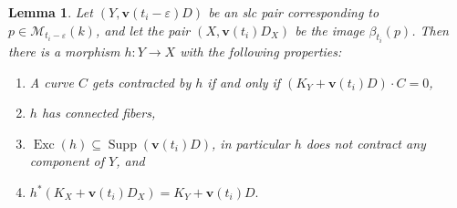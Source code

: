 \documentclass[11pt]{amsart}
\newtheorem{lemma}[theorem]{Lemma}
\theoremstyle{definition}
\theoremstyle{remark}
\newcommand{\sM}{\mathscr{M}}
\newcommand{\Supp}{\operatorname{Supp}}
\begin{document}
	\begin{lemma}\label{lemma:the:reduction:morphisms:contract:curves:in:D}
		Let $(Y,\mathbf{v}(t_i-\varepsilon)D)$ be an slc pair corresponding to  $p \in \sM_{t_i-\varepsilon}(k)$, and
		let the pair $(X,\mathbf{v}(t_i)D_X)$ be the image  $\beta_{t_i}(p)$. Then there is a morphism $h: Y \to X$ with the following properties:
		\begin{enumerate}
			\item A curve $C$ gets contracted by $h$ if and only if $(K_Y+\mathbf{v}(t_i)D) \cdot C=0$,
			\item $h$ has connected fibers,
			\item $\operatorname{Exc}(h) \subseteq \Supp(\mathbf{v}(t_i)D)$, in particular $h$ does not contract any component of $Y$, and
			\item $h^*(K_X+\mathbf{v}(t_i)D_X)=K_Y+\mathbf{v}(t_i)D.$
		\end{enumerate}
	\end{lemma}
\end{document}
